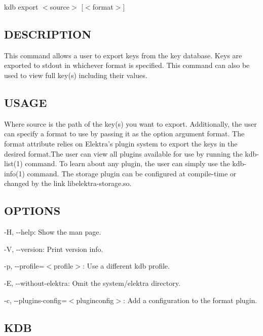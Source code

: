 {\ttfamily kdb export $<$source$>$ \mbox{[}$<$format$>$\mbox{]}}

\subsection*{D\+E\+S\+C\+R\+I\+P\+T\+I\+O\+N}

This command allows a user to export keys from the key database. Keys are exported to {\ttfamily stdout} in whichever format is specified. This command can also be used to view full key(s) including their values.

\subsection*{U\+S\+A\+G\+E}

Where {\ttfamily source} is the path of the key(s) you want to export. Additionally, the user can specify a format to use by passing it as the option argument {\ttfamily format}. The {\ttfamily format} attribute relies on Elektra's plugin system to export the keys in the desired format.\+The user can view all plugins available for use by running the kdb-\/list(1) command. To learn about any plugin, the user can simply use the kdb-\/info(1) command. The {\ttfamily storage} plugin can be configured at compile-\/time or changed by the link {\ttfamily libelektra-\/storage.\+so}.

\subsection*{O\+P\+T\+I\+O\+N\+S}


\begin{DoxyItemize}
\item {\ttfamily -\/\+H}, {\ttfamily -\/-\/help}\+: Show the man page.
\item {\ttfamily -\/\+V}, {\ttfamily -\/-\/version}\+: Print version info.
\item {\ttfamily -\/p}, {\ttfamily -\/-\/profile}=$<$profile$>$\+: Use a different kdb profile.
\item {\ttfamily -\/\+E}, {\ttfamily -\/-\/without-\/elektra}\+: Omit the {\ttfamily system/elektra} directory.
\item {\ttfamily -\/c}, {\ttfamily -\/-\/plugins-\/config}=$<$pluginconfig$>$\+: Add a configuration to the format plugin.
\end{DoxyItemize}

\subsection*{K\+D\+B}


